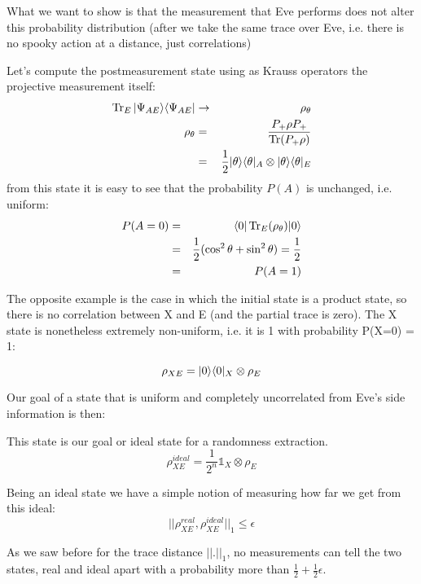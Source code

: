 \begin{example}
	What we want to show is that the measurement that Eve performs does not alter this probability distribution (after we take the same trace over Eve, i.e. there is no spooky action at a distance, just correlations)

	Let's compute the postmeasurement state using as Krauss operators the projective measurement itself:
	\begin{eqnarray}
		\operatorname{Tr}_E{\lvert\Psi_{AE}\rangle\langle\Psi_{AE}\rvert} &\rightarrow&  \rho_\theta \\
		\rho_\theta &=& \displaystyle\frac{P_+\rho P_+}{\operatorname{Tr} (P_+\rho)} \\
		&=& \frac{1}{2} \lvert\theta\rangle \langle\theta\rvert_A \otimes \lvert\theta\rangle \langle\theta\rvert_E
	\end{eqnarray}
	from this state it is easy to see that the probability $P(A)$ is unchanged, i.e. uniform:
	\begin{eqnarray}
		P(A = 0) &=& \langle0\rvert\operatorname{Tr}_E(\rho_\theta)\lvert0\rangle \\
		&=& \frac{1}{2} (\cos^2{\theta} + \sin^2{\theta}) = \frac{1}{2}\\
		&=& P(A = 1)
	\end{eqnarray}
\end{example}

\begin{example}
	The opposite example is the case in which the initial state is a product state, so there is no correlation between X and E (and the partial trace is zero). The X state is nonetheless extremely non-uniform, i.e. it is 1 with probability P(X=0) = 1:

	\begin{equation}
		\rho_{XE} = \lvert0\rangle\langle0\rvert_X \otimes \rho_E
	\end{equation}
\end{example}

Our goal of a state that is uniform and completely uncorrelated from Eve's side information is then:

 \label{eq:PAgoalstate}
This state is our goal or ideal state for a randomness extraction.
\begin{equation}
	\rho^{ideal}_{XE} = \frac{1}{2^n}\mathbb{1}_X \otimes \rho_E
\end{equation}

Being an ideal state we have a simple notion of measuring how far we get from this ideal:
\begin{equation}
	||\rho^{real}_{XE}, \rho^{ideal}_{XE}||_1 \le \epsilon
\end{equation}

As we saw before for the trace distance $||.||_1$, no measurements can tell the two states, real and ideal apart with a probability more than $\frac{1}{2} +\frac{1}{2}\epsilon$.
